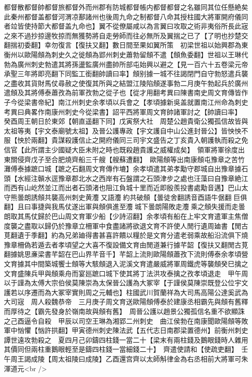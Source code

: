 都督散都督帥都督旅都督外而州郡有防城都督帳内都督都督之名雖同其位任懸絶矣此秦州都督盖都督河渭凉鄯諸州也後周九命之制都督八命其授柱國大將軍開府儀同者竝皆使持節大都督盖九命也】翼不從僚屬咸以為言翼曰攻取之術非夷俗所長此宼之來不過抄掠邊牧掠而無獲勢將自走勞師而往必無所及翼揣之已了【了明也抄楚交翻揣初委翻】幸勿復言【復扶又翻】數日間至果如翼所策　初梁世祖以始興郡為東衡州以歐陽頠為刺史久之徙頠為郢州刺史蕭勃留頠不遣【頠魚委翻】世祖以王琳代勃為廣州刺史勃遣其將孫盪監廣州盡帥所部屯始興以避之【見一百六十五卷梁元帝承聖三年將即亮翻下同監工銜翻帥讀曰率】頠别據一城不往謁閉門自守勃怒遣兵襲之盡收其貨財馬仗尋赦之使復其所與之結盟江陵陷頠遂事勃二月庚午勃起兵於廣州遣頠及其將傅泰蕭孜為前軍孜勃之從子也【從才用翻考異曰陳書南史周文育傳皆作子今從梁書帝紀】南江州刺史余孝頃以兵會之【孝頃據新吳盖就置南江州命為刺史　考異曰典畧作南康州刺史今從梁書】詔平西將軍周文育帥諸軍討之【帥讀曰率】　癸酉周王朝日於東郊【朝直遥翻下同】戊寅祭大社　周楚公趙貴衛公獨孤信故皆與太祖等夷【宇文泰廟號太祖】及晉公護專政【宇文護自中山公進封晉公】皆怏怏不服【怏於兩翻】貴謀殺護信止之開府儀同三司宇文盛告之丁亥貴入朝護執而殺之免信官【此所謂主少國疑大臣未附之時也既殺趙貴護之威權成矣】　領軍將軍徐度出東關侵齊戊子至合肥燒齊船三千艘【艘蘇遭翻】　歐陽頠等出南康頠屯豫章之苦竹灘傅泰據蹠口城【蹠之石翻周文育傳作塶】余孝頃遣其弟孝勱守郡城自出豫章據石頭【水經注贑水逕豫章郡北水之西岸有石盤謂之石頭津步之處也汪藻曰自豫章絶江而西有山屹然並江而出者石頭渚也阻江負城十里而近即殷羨投書處勱音邁】巴山太守熊曇朗誘頠共襲高州刺史黄灋又語灋約共破頠【曇徒舍翻誘音酉語牛倨翻巨俱翻】且曰事捷與我馬仗遂出軍與頠俱進至灋城下曇朗陽敗走灋乘之頠失援而走曇朗取其馬仗歸於巴山周文育軍少船【少詩沼翻】余孝頃有船在上牢文育遣軍主焦僧度襲之盡取以歸仍於豫章立柵軍中食盡諸將欲退文育不許使人閒行遺周廸書【閒古莧翻遺于季翻】約為兄弟廸得書甚喜許饋以糧於是文育分遣老弱乘故船沿流俱下燒豫章柵偽若遁去者孝頃望之大喜不復設備文育由閒道兼行據芊韶【復扶又翻閒古莧翻據姚思亷梁書芊韶在巴山界芊音千】芊韶上流則歐陽頠蕭孜下流則傅泰余孝頃營文育據其中間築城饗士頠等大駭頠退入泥溪文育遣嚴威將軍周鐵虎等襲頠癸巳擒之文育盛陳兵甲與頠乘舟而宴廵蹠口城下使其將丁法洪攻泰擒之孜孝頃退走　甲午周以于謹為太傅大宗伯侯莫陳崇為太保晉公護為大冢宰【于謹侯莫陳崇既登公位宇文護若以序遷而為大冢宰實則周之元輔也】柱國武川賀蘭祥為大司馬高陽公達奚武為大司宼　周人殺魏恭帝　三月庚子周文育送歐陽頠傅泰於建康丞相霸先與頠有舊釋而厚待之【霸先發身於嶺南故與頠有舊】　周晉公護以趙景公獨孤信名重不欲顯誅之己酉逼令自殺　甲辰以司空王琳為湘郢二州刺史　曲江侯勃在南康聞歐陽頠等敗軍中忷懼【忷許拱翻】甲寅德州刺史陳法武【五代志日南郡梁置德州】前衡州刺史譚世遠攻勃殺之　夏四月己卯鑄四柱錢一當二十【梁末有兩柱錢及鵝眼錢時人雜用其價同但兩柱重鵝眼輕至是鑄四柱錢一當細錢二十】　齊遣使請和【使疏吏翻】　壬午周王謁成陵【周太祖陵曰成陵】乙酉還宫齊以太師斛律金為右丞相前大將軍可朱渾道元<br />
